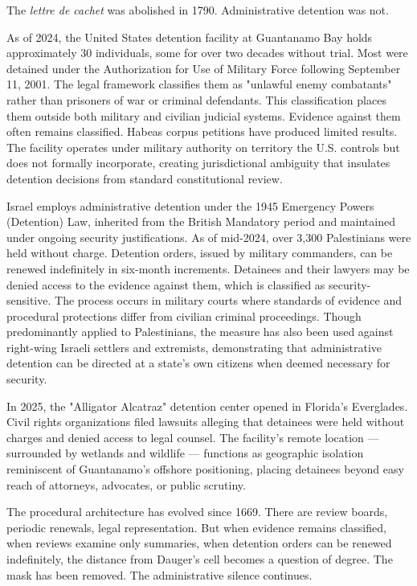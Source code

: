 \begin{commentary}
The \textit{lettre de cachet} was abolished in 1790. Administrative detention was not.

As of 2024, the United States detention facility at Guantanamo Bay holds approximately 30 individuals, some for over two decades without trial. Most were detained under the Authorization for Use of Military Force following September 11, 2001. The legal framework classifies them as "unlawful enemy combatants" rather than prisoners of war or criminal defendants. This classification places them outside both military and civilian judicial systems. Evidence against them often remains classified. Habeas corpus petitions have produced limited results. The facility operates under military authority on territory the U.S. controls but does not formally incorporate, creating jurisdictional ambiguity that insulates detention decisions from standard constitutional review.

Israel employs administrative detention under the 1945 Emergency Powers (Detention) Law, inherited from the British Mandatory period and maintained under ongoing security justifications. As of mid-2024, over 3,300 Palestinians were held without charge. Detention orders, issued by military commanders, can be renewed indefinitely in six-month increments. Detainees and their lawyers may be denied access to the evidence against them, which is classified as security-sensitive. The process occurs in military courts where standards of evidence and procedural protections differ from civilian criminal proceedings. Though predominantly applied to Palestinians, the measure has also been used against right-wing Israeli settlers and extremists, demonstrating that administrative detention can be directed at a state's own citizens when deemed necessary for security.

In 2025, the "Alligator Alcatraz" detention center opened in Florida's Everglades. Civil rights organizations filed lawsuits alleging that detainees were held without charges and denied access to legal counsel. The facility's remote location — surrounded by wetlands and wildlife — functions as geographic isolation reminiscent of Guantanamo's offshore positioning, placing detainees beyond easy reach of attorneys, advocates, or public scrutiny.

The procedural architecture has evolved since 1669. There are review boards, periodic renewals, legal representation. But when evidence remains classified, when reviews examine only summaries, when detention orders can be renewed indefinitely, the distance from Dauger's cell becomes a question of degree. The mask has been removed. The administrative silence continues.
\end{commentary}
